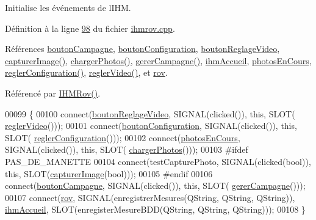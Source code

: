 Initialise les événements de l\textquotesingle{}I\+HM. 



Définition à la ligne \hyperlink{ihmrov_8cpp_source_l00098}{98} du fichier \hyperlink{ihmrov_8cpp_source}{ihmrov.\+cpp}.



Références \hyperlink{ihmrov_8h_source_l00057}{bouton\+Campagne}, \hyperlink{ihmrov_8h_source_l00058}{bouton\+Configuration}, \hyperlink{ihmrov_8h_source_l00052}{bouton\+Reglage\+Video}, \hyperlink{ihmrov_8cpp_source_l00179}{capturer\+Image()}, \hyperlink{ihmrov_8cpp_source_l00223}{charger\+Photos()}, \hyperlink{ihmrov_8cpp_source_l00202}{gerer\+Campagne()}, \hyperlink{ihmrov_8h_source_l00046}{ihm\+Accueil}, \hyperlink{ihmrov_8h_source_l00051}{photos\+En\+Cours}, \hyperlink{ihmrov_8cpp_source_l00170}{regler\+Configuration()}, \hyperlink{ihmrov_8cpp_source_l00161}{regler\+Video()}, et \hyperlink{ihmrov_8h_source_l00047}{rov}.



Référencé par \hyperlink{ihmrov_8cpp_source_l00015}{I\+H\+M\+Rov()}.


\begin{DoxyCode}
00099 \{
00100     connect(\hyperlink{class_i_h_m_rov_a57cb3bea4f1f9149d730ccc5688581fc}{boutonReglageVideo}, SIGNAL(clicked()), \textcolor{keyword}{this}, SLOT(
      \hyperlink{class_i_h_m_rov_a68653dfe09dbb9695797d60e9190366b}{reglerVideo}()));
00101     connect(\hyperlink{class_i_h_m_rov_aea67721180bf155892a297b3c39309c5}{boutonConfiguration}, SIGNAL(clicked()), \textcolor{keyword}{this}, SLOT(
      \hyperlink{class_i_h_m_rov_a9b517b4891917634d64c903894bcc48b}{reglerConfiguration}()));
00102     connect(\hyperlink{class_i_h_m_rov_a0896dea1a2d901a7cf43a344e22fc66d}{photosEnCours}, SIGNAL(clicked()), \textcolor{keyword}{this}, SLOT(
      \hyperlink{class_i_h_m_rov_aae5c264f7a1b6d27c1d2e25574c88c5b}{chargerPhotos}()));
00103 \textcolor{preprocessor}{    #ifdef PAS\_DE\_MANETTE}
00104     connect(testCapturePhoto, SIGNAL(clicked(\textcolor{keywordtype}{bool})), \textcolor{keyword}{this}, SLOT(\hyperlink{class_i_h_m_rov_a15fe4fd090a0171bb9ad24e28d3b978a}{capturerImage}(\textcolor{keywordtype}{bool})));
00105 \textcolor{preprocessor}{    #endif}
00106     connect(\hyperlink{class_i_h_m_rov_a324be23537f48127c49b943aa439a978}{boutonCampagne}, SIGNAL(clicked()), \textcolor{keyword}{this}, SLOT(
      \hyperlink{class_i_h_m_rov_a3660d3b4bf61367534eae9d0c3618a5e}{gererCampagne}()));
00107     connect(\hyperlink{class_i_h_m_rov_a777ca33fdb295ba6b6773e880356fa1e}{rov}, SIGNAL(enregistrerMesures(QString, QString, QString)), 
      \hyperlink{class_i_h_m_rov_aa22f6fe8daf5c67071ec02a348e5cc3e}{ihmAccueil}, SLOT(enregisterMesureBDD(QString, QString, QString)));
00108 \}
\end{DoxyCode}
\mbox{\label{class_i_h_m_rov_a955daa231d959666fa7ed01346b2b6ef}} 
